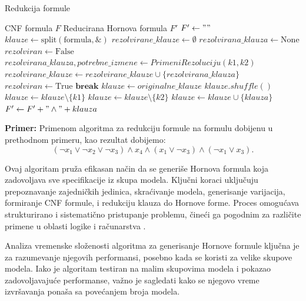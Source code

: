 \documentclass[12pt,oneside]{memoir}
\begin{document}
\begin{algorithm}[H]
\caption{Redukcija formule}
\renewcommand{\algorithmicrequire}{\textbf{Ulaz:}}
\renewcommand{\algorithmicensure}{\textbf{Izlaz:}}
\begin{algorithmic}[1]
\REQUIRE CNF formula $F$
\ENSURE Reducirana Hornova formula $F'$
\STATE $F' \gets ""$
\STATE $klauze \gets \text{split}(\text{formula}, \&)$
    \STATE $rezolvirane\_klauze \gets \emptyset$
    \STATE $rezolvirana\_klauza \gets \text{None}$
    \STATE $rezolviran \gets \text{False}$
        \STATE $rezolvirana\_klauza, potrebne\_izmene \gets PrimeniRezoluciju(k1,k2)$
            \STATE $rezolvirane\_klauze \gets rezolvirane\_klauze \cup \{rezolvirana\_klauza\}$
        \ENDIF
        \STATE $rezolviran \gets \text{True}$  \STATE $\textbf{break}$
    \ENDFOR
        \STATE $klauze \gets originalne\_klauze$
        \STATE $klauze.shuffle()$
    \ENDIF
        \STATE $klauze \gets klauze \setminus \{k1\}$
        \STATE $klauze \gets klauze \setminus \{k2\}$
    \ENDIF
        \STATE $klauze \gets klauze \cup \{klauza\}$
    \ENDFOR
\ENDWHILE
{}
    \STATE $F' \gets F' + "\wedge" + klauza$
\ENDFOR
\end{algorithmic}
\end{algorithm}

\textbf{Primer:} Primenom algoritma za redukciju formule na formulu dobijenu u prethodnom primeru, kao rezultat dobijemo:
\[
(\neg x_1 \vee \neg x_2 \vee \neg x_3) \wedge x_4 \wedge (x_1 \vee \neg x_3) \wedge (\neg x_1 \vee x_3)\text{.}
\]

Ovaj algoritam pruža efikasan način da se generiše Hornova formula koja zadovoljava sve specifikacije iz skupa modela. Ključni koraci uključuju prepoznavanje zajedničkih jedinica, skraćivanje modela, generisanje varijacija, formiranje CNF formule, i redukciju klauza do Hornove forme. Proces omogućava strukturirano i sistematično pristupanje problemu, čineći ga pogodnim za različite primene u oblasti logike i računarstva \cite{russell}.


Analiza vremenske složenosti algoritma za generisanje Hornove formule ključna je za razumevanje njegovih performansi, posebno kada se koristi za velike skupove modela. Iako je algoritam testiran na malim skupovima modela i pokazao zadovoljavajuće performanse, važno je sagledati kako se njegovo vreme izvršavanja ponaša sa povećanjem broja modela.
\end{document}
